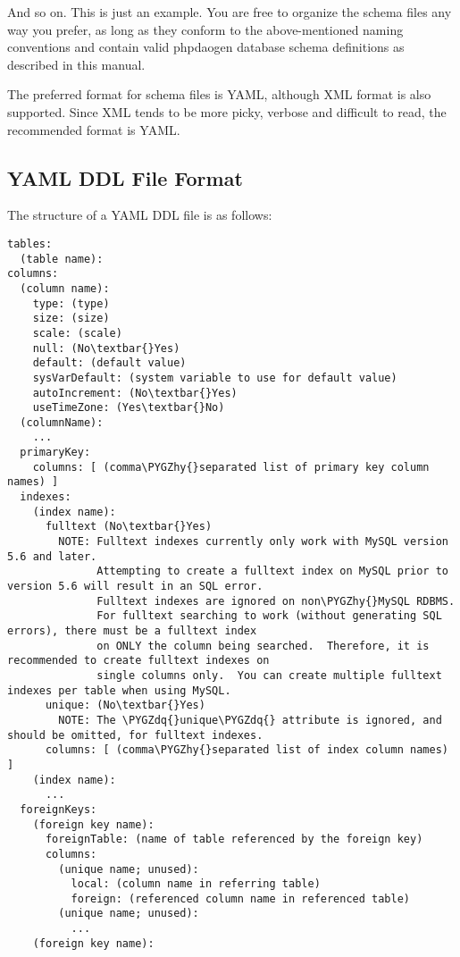 \documentclass[letterpaper,10pt,english]{sphinxmanual}
\def\PYGZhy{\char`\-}
\def\PYGZdq{\char`\"}
\begin{document}
And so on.  This is just an example.  You are free to organize the schema files any way you prefer,
as long as they conform to the above-mentioned naming conventions and contain valid phpdaogen
database schema definitions as described in this manual.

The preferred format for schema files is YAML, although XML format is also supported.  Since XML
tends to be more picky, verbose and difficult to read, the recommended format is YAML.


\subsection{YAML DDL File Format}
\label{jaxFrameworkGuide:yaml-ddl-file-format}
The structure of a YAML DDL file is as follows:

\begin{Verbatim}[commandchars=\\\{\}]
tables:
  (table name):
columns:
  (column name):
    type: (type)
    size: (size)
    scale: (scale)
    null: (No\textbar{}Yes)
    default: (default value)
    sysVarDefault: (system variable to use for default value)
    autoIncrement: (No\textbar{}Yes)
    useTimeZone: (Yes\textbar{}No)
  (columnName):
    ...
  primaryKey:
    columns: [ (comma\PYGZhy{}separated list of primary key column names) ]
  indexes:
    (index name):
      fulltext (No\textbar{}Yes)
        NOTE: Fulltext indexes currently only work with MySQL version 5.6 and later.
              Attempting to create a fulltext index on MySQL prior to version 5.6 will result in an SQL error.
              Fulltext indexes are ignored on non\PYGZhy{}MySQL RDBMS.
              For fulltext searching to work (without generating SQL errors), there must be a fulltext index
              on ONLY the column being searched.  Therefore, it is recommended to create fulltext indexes on
              single columns only.  You can create multiple fulltext indexes per table when using MySQL.
      unique: (No\textbar{}Yes)
        NOTE: The \PYGZdq{}unique\PYGZdq{} attribute is ignored, and should be omitted, for fulltext indexes.
      columns: [ (comma\PYGZhy{}separated list of index column names) ]
    (index name):
      ...
  foreignKeys:
    (foreign key name):
      foreignTable: (name of table referenced by the foreign key)
      columns:
        (unique name; unused):
          local: (column name in referring table)
          foreign: (referenced column name in referenced table)
        (unique name; unused):
          ...
    (foreign key name):

\end{Verbatim}
\end{document}
